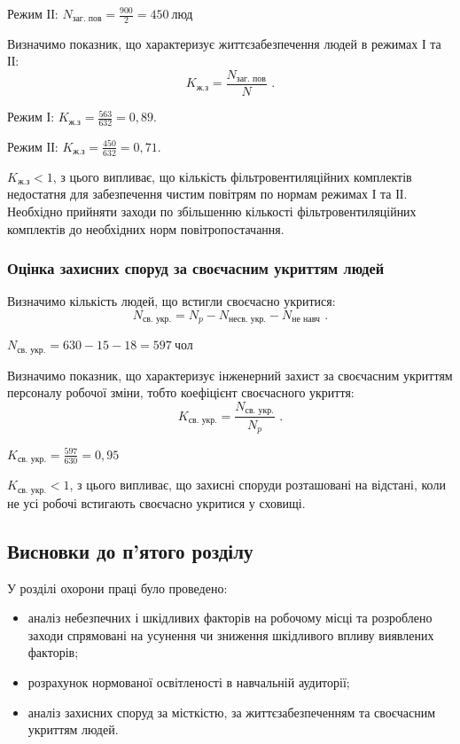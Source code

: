 \documentclass[a4paper,ukrainian,utf8,nocolumnsxix,floatsection,equationsection]{eskdtext}
\renewcommand\paragraph{\subsubsection}
\begin{document}
Режим ІІ: $N_\text{заг. пов} = \frac{900}{2} = 450 \:\text{люд}$

Визначимо показник, що характеризує життєзабезпечення людей в режимах І та ІІ:
\begin{equation}
	K_\text{ж.з} = \frac{N_\text{заг. пов}}{N} \text{ .}
\end{equation}

Режим І: $K_\text{ж.з} = \frac{563}{632} = 0,89$.

Режим ІІ: $K_\text{ж.з} = \frac{450}{632} = 0,71$.

$K_\text{ж.з} < 1$, з цього випливає, що кількість фільтровентиляційних комплектів недостатня для забезпечення чистим повітрям по нормам режимах І та ІІ. Необхідно прийняти заходи по збільшенню кількості фільтровентиляційних комплектів до необхідних норм повітропостачання.

\paragraph{Оцінка захисних споруд за своєчасним укриттям людей}

Визначимо кількість людей, що встигли своєчасно укритися:
\begin{equation}
	N_\text{св. укр.} = N_p - N_\text{несв. укр.} - N_\text{не навч} \text{ .}
\end{equation}

$N_\text{св. укр.} = 630 - 15 - 18 = 597 \:\text{чол}$

Визначимо показник, що характеризує інженерний захист за своєчасним укриттям персоналу робочої зміни, тобто коефіцієнт своєчасного укриття:
\begin{equation}
	K_\text{св. укр.} = \frac{N_\text{св. укр.}}{N_p} \text{ .}
\end{equation}

$K_\text{св. укр.} = \frac{597}{630} = 0,95$

$K_\text{св. укр.} < 1$, з цього випливає, що захисні споруди розташовані на відстані, коли не усі робочі встигають своєчасно укритися у сховищі.

\subsection{Висновки до п'ятого розділу}

У розділі охорони праці було проведено:

\begin{itemize}
	\item аналіз небезпечних і шкідливих факторів на робочому місці та розроблено заходи спрямовані на усунення чи зниження шкідливого впливу виявлених факторів;
	\item розрахунок нормованої освітленості в навчальній аудиторії;
	\item аналіз захисних споруд за місткістю, за життєзабезпеченням та своєчасним укриттям людей. 
\end{itemize}
\end{document}
